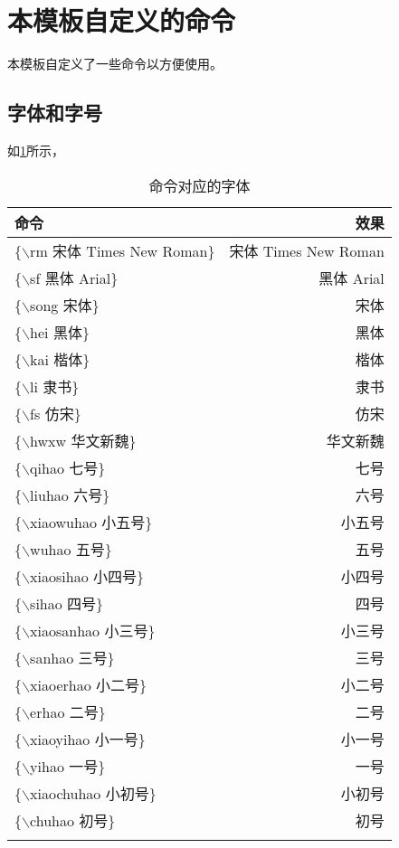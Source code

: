\section{本模板自定义的命令}
本模板自定义了一些命令以方便使用。

\subsection{字体和字号}
如\cref{zt}所示，
\begin{longtable}{lr}	
	\hline
	 命令 & 效果\\
	\hline
	\endhead
	\{$\backslash$rm 宋体 Times New Roman\} & {\rm 宋体 Times New Roman}\\
	\{$\backslash$sf 黑体 Arial\} & {\sf 黑体 Arial}\\
	\{$\backslash$song 宋体\} & {\song 宋体}\\
	\{$\backslash$hei 黑体\} & {\hei 黑体}\\
	\{$\backslash$kai 楷体\} & {\kai 楷体}\\
	\{$\backslash$li 隶书\} & {\li 隶书}\\
	\{$\backslash$fs 仿宋\} & {\fs 仿宋}\\ 
	\{$\backslash$hwxw 华文新魏\} &{\hwxw 华文新魏}\\
	\{$\backslash$qihao 七号\} & {\qihao 七号}\\
	\{$\backslash$liuhao 六号\} & {\liuhao 六号}\\
	\{$\backslash$xiaowuhao 小五号\} & {\xiaowuhao 小五号}\\
	\{$\backslash$wuhao 五号\} & {\wuhao 五号}\\
	\{$\backslash$xiaosihao 小四号\} & {\xiaosihao 小四号}\\
	\{$\backslash$sihao 四号\} & {\sihao 四号}\\
	\{$\backslash$xiaosanhao 小三号\} & {\xiaosanhao 小三号}\\
	\{$\backslash$sanhao 三号\} & {\sanhao 三号}\\
	\{$\backslash$xiaoerhao 小二号\} & {\xiaoerhao 小二号}\\
	\{$\backslash$erhao 二号\} & {\erhao 二号}\\
	\{$\backslash$xiaoyihao 小一号\} & {\xiaoyihao 小一号}\\
	\{$\backslash$yihao 一号\} & {\yihao 一号}\\
	\{$\backslash$xiaochuhao 小初号\} & {\xiaochuhao 小初号}\\
	\{$\backslash$chuhao 初号\} & {\chuhao 初号} \\
		\caption{命令对应的字体\label{zt}}
\end{longtable}

